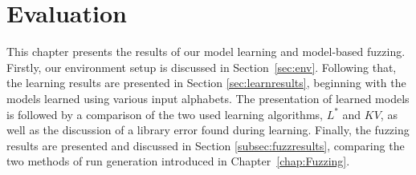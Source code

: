 %
%
% 
% 
% 

\chapter{Evaluation} \label{chap:Evaluation}

This chapter presents the results of our model learning and model-based fuzzing. Firstly, our environment setup is discussed in Section~\ref{sec:env}. Following that, the learning results are presented in Section \ref{sec:learnresults}, beginning with the models learned using various input alphabets. The presentation of learned models is followed by a comparison of the two used learning algorithms, $L^*$ and $KV$, as well as the discussion of a library error found during learning. Finally, the fuzzing results are presented and discussed in Section \ref{subsec:fuzzresults}, comparing the two methods of run generation introduced in Chapter~\ref{chap:Fuzzing}.

